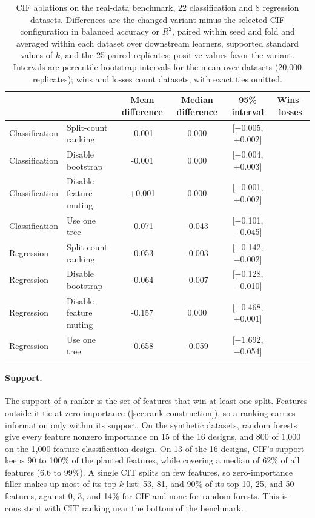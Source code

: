 \begin{table}[htb]
  \centering
  \footnotesize
  \setlength{\tabcolsep}{4pt}
  \renewcommand{\arraystretch}{1.08}
  \begin{tabular}{@{}llS[table-format=+1.3]S[table-format=+1.3]cc@{}}
    \toprule
     &  & {Mean difference} & {Median difference} & 95\% interval & Wins--losses \\
    \midrule
    Classification & Split-count ranking & -0.001 & 0.000 & [$-$0.005, +0.002] &  \\
    Classification & Disable bootstrap & -0.001 & 0.000 & [$-$0.004, +0.003] &  \\
    Classification & Disable feature muting & +0.001 & 0.000 & [$-$0.001, +0.002] &  \\
    Classification & Use one tree & -0.071 & -0.043 & [$-$0.101, $-$0.045] &  \\
    \addlinespace
    Regression & Split-count ranking & -0.053 & -0.003 & [$-$0.142, $-$0.002] &  \\
    Regression & Disable bootstrap & -0.064 & -0.007 & [$-$0.128, $-$0.010] &  \\
    Regression & Disable feature muting & -0.157 & 0.000 & [$-$0.468, +0.001] &  \\
    Regression & Use one tree & -0.658 & -0.059 & [$-$1.692, $-$0.054] &  \\
    \bottomrule
  \end{tabular}
  \caption{CIF ablations on the real-data benchmark, 22 classification and 8
  regression datasets. Differences are the changed variant minus the selected
  CIF configuration in balanced accuracy or $R^2$, paired within seed and fold
  and averaged within each dataset over downstream learners, supported standard
  values of $k$, and the 25 paired replicates; positive values favor the
  variant. Intervals are percentile bootstrap intervals for the mean over
  datasets (20{,}000 replicates); wins and losses count datasets, with exact
  ties omitted.}
  \label{tab:cif-ranking-ablation}
\end{table}

\paragraph{Support.}
The support of a ranker is the set of features that win at least one split.
Features outside it tie at zero importance (\cref{sec:rank-construction}), so a
ranking carries information only within its support. On the synthetic datasets, random forests give every feature nonzero
importance on 15 of the 16 designs, and 800 of 1,000 on the 1,000-feature
classification design. On 13 of the 16 designs, CIF's support keeps 90 to
100\% of the planted features, while covering a median of 62\% of all features
(6.6 to 99\%). A single
CIT splits on few features, so zero-importance filler makes up most of its
top-$k$ list: 53, 81, and 90\% of its top 10, 25, and 50 features, against 0,
3, and 14\% for CIF and none for random forests. This is consistent with CIT
ranking near the bottom of the benchmark.

